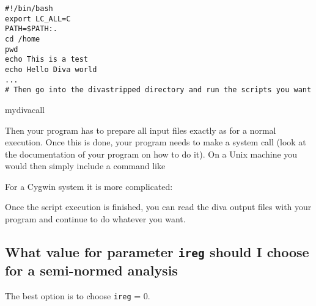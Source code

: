 \begin{exfile}[htpb]
\begin{footnotesize}
\begin{verbatim}
#!/bin/bash
export LC_ALL=C
PATH=$PATH:.
cd /home
pwd
echo This is a test
echo Hello Diva world
...
# Then go into the divastripped directory and run the scripts you want
\end{verbatim}
\end{footnotesize}
\caption{mydivacall\label{ex:mydivacall}}
\end{exfile}

Then your program has to prepare all input files exactly as for a normal \diva execution. Once this is done, your program needs to make a system call (look at the documentation of your program on how to do it). On a Unix machine you would then simply include a command like


For a Cygwin system it is more complicated:



Once the script execution is finished, you can read the diva output files with your program and continue to do whatever you want.


\subsection{What value for parameter \texttt{ireg} should I choose for a semi-normed analysis}

The best option is to choose \texttt{ireg} = 0.

